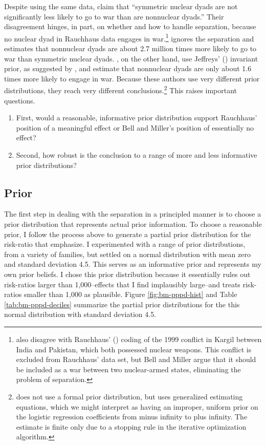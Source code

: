 \documentclass[12pt]{article}
\begin{document}
Despite using the same data, \citet[p. 9]{BellMiller2015} claim that ``symmetric nuclear dyads are not significantly less likely to go to war than are nonnuclear dyads.'' 
Their disagreement hinges, in part, on whether and how to handle separation, because no nuclear dyad in Rauchhaus data engages in war.\footnote{
\cite{BellMiller2015} also disagree with Rauchhaus' (\citeyear{Rauchhaus2009}) coding of the 1999 conflict in Kargil between India and Pakistan, which both possessed nuclear weapons. 
This conflict is excluded from Rauchhaus' data set, but Bell and Miller argue that it should be included as a war between two nuclear-armed states, eliminating the problem of separation.} 
\cite{Rauchhaus2009} ignores the separation and estimates that nonnuclear dyads are about 2.7 million times more likely to go to war than symmetric nuclear dyads.
\cite{BellMiller2015}, on the other hand, use Jeffreys' (\citeyear{Jeffreys1946}) invariant prior, as suggested by \cite{Zorn2005}, and estimate that nonnuclear dyads are only about 1.6 times more likely to engage in war. 
Because these authors use very different prior distributions, they reach very different conclusions.\footnote{
\cite{Rauchhaus2009} does not use a formal prior distribution, but uses generalized estimating equations, which we might interpret as having an improper, uniform prior on the logistic regression coefficients from minus infinity to plus infinity. 
The estimate is finite only due to a stopping rule in the iterative optimization algorithm.} 
This raises important questions. 
\begin{enumerate}
\item First, would a reasonable, informative prior distribution support Rauchhaus' position of a meaningful effect or Bell and Miller's position of essentially no effect? 
\item Second, how robust is the conclusion to a range of more and less informative prior distributions?
\end{enumerate}

\subsection*{Prior}

The first step in dealing with the separation in a principled manner is to choose a prior distribution that represents actual prior information. 
To choose a reasonable prior, I follow the process above to generate a partial prior distribution for the risk-ratio that \cite{BellMiller2015} emphasize. 
I experimented with a range of prior distributions, from a variety of families, but settled on a normal distribution with mean zero and standard deviation 4.5. 
This serves as an informative prior and represents my own prior beliefs.   
I chose this prior distribution because it essentially rules out risk-ratios larger than 1,000--effects that I find implausibly large--and treats risk-ratios smaller than 1,000 as plausible. 
Figure \ref{fig:bm-pppd-hist} and Table \ref{tab:bm-pppd-deciles} summarize the partial prior distributions for the this normal distribution with standard deviation 4.5.
\end{document}

